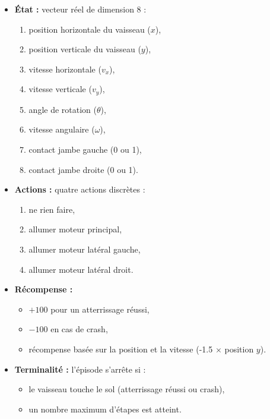 \begin{itemize}
    \item[] \textbf{État :} vecteur réel de dimension 8 :
    \begin{enumerate}
        \item position horizontale du vaisseau ($x$),
        \item position verticale du vaisseau ($y$),
        \item vitesse horizontale ($v_x$),
        \item vitesse verticale ($v_y$),
        \item angle de rotation ($\theta$),
        \item vitesse angulaire ($\omega$),
        \item contact jambe gauche (0 ou 1),
        \item contact jambe droite (0 ou 1).
    \end{enumerate}

    \item[] \textbf{Actions :} quatre actions discrètes :
    \begin{enumerate}
        \item ne rien faire,
        \item allumer moteur principal,
        \item allumer moteur latéral gauche,
        \item allumer moteur latéral droit.
    \end{enumerate}

    \item[] \textbf{Récompense :}
    \begin{itemize}
        \item $+100$ pour un atterrissage réussi,
        \item $-100$ en cas de crash,
        \item récompense basée sur la position et la vitesse (-1.5 $\times$ position $y$).
    \end{itemize}

    \item[] \textbf{Terminalité :} l'épisode s'arrête si :
    \begin{itemize}
        \item[] le vaisseau touche le sol (atterrissage réussi ou crash),
        \item[] un nombre maximum d'étapes est atteint.
    \end{itemize}
\end{itemize}

